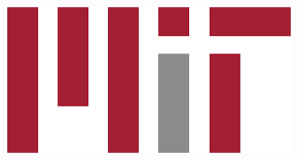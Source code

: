 \begin{titlepage}
\hspace{+0.6cm}\includegraphics[scale=0.15]{fig/mit.png}\\
\hdashrule{\linewidth}{0.5pt}{}
\end{titlepage}


